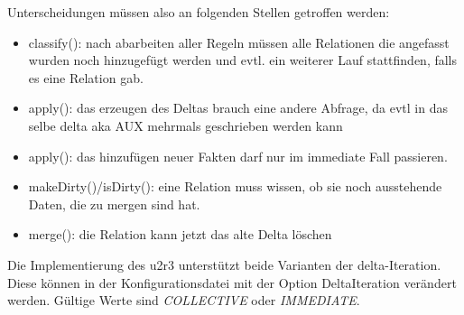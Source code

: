 Unterscheidungen müssen also an folgenden Stellen getroffen werden:
\begin{itemize}
  \item classify(): nach abarbeiten aller Regeln müssen alle Relationen die angefasst wurden noch hinzugefügt werden und evtl. ein weiterer Lauf stattfinden, falls es eine Relation gab.
  \item apply(): das erzeugen des Deltas brauch eine andere Abfrage, da evtl in das selbe delta aka AUX mehrmals geschrieben werden kann
  \item apply(): das hinzufügen neuer Fakten darf nur im immediate Fall passieren.
  \item makeDirty()/isDirty(): eine Relation muss wissen, ob sie noch ausstehende Daten, die zu mergen sind hat.
  \item merge(): die Relation kann jetzt das alte Delta löschen 
\end{itemize}

Die Implementierung des u2r3 unterstützt beide Varianten der delta-Iteration. Diese können in der Konfigurationsdatei mit der Option DeltaIteration verändert werden. Gültige Werte sind \emph{COLLECTIVE} oder \emph{IMMEDIATE}.
